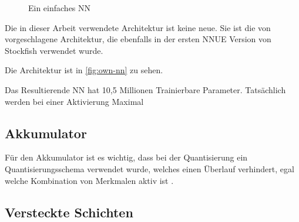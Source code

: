 \begin{figure}
{
  }%
  \caption{Ein einfaches \acl{NN}}
  \label{fig:own-nn}
\end{figure}

Die in dieser Arbeit verwendete Architektur ist keine neue. Sie ist die von \citeauthor{YNasu2018} \cite{YNasu2018} vorgeschlagene Architektur, die ebenfalls in der ersten \ac{NNUE} Version von Stockfish verwendet wurde.

Die Architektur ist in \autoref{fig:own-nn} zu sehen.


Das Resultierende \ac{NN} hat 10,5 Millionen Trainierbare Parameter. Tatsächlich werden bei einer Aktivierung Maximal


\subsection{Akkumulator}


Für den Akkumulator ist es wichtig, dass bei der Quantisierung ein Quantisierungsschema verwendet wurde, welches einen Überlauf verhindert, egal welche Kombination von Merkmalen aktiv ist \cite{StockfishNNUE}.

\subsection{Versteckte Schichten}

